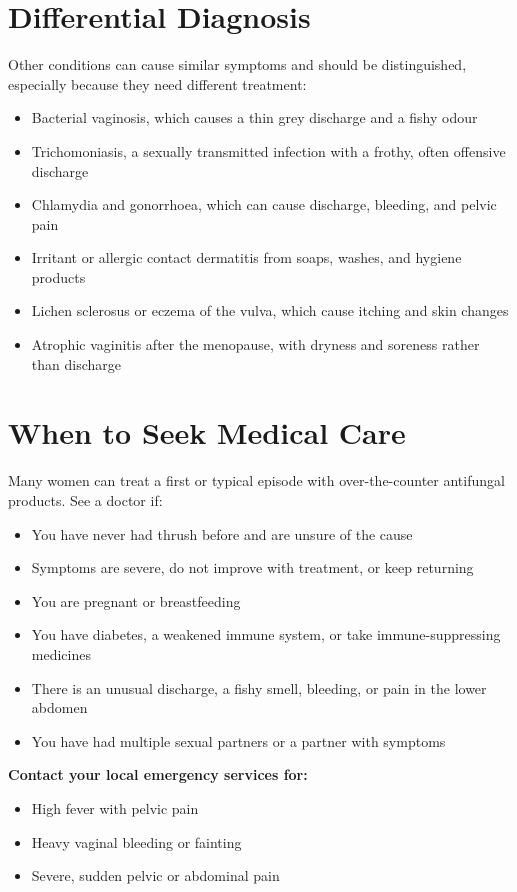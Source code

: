 \section*{Differential Diagnosis}
Other conditions can cause similar symptoms and should be distinguished, especially because they need different treatment:
\begin{itemize}
    \item Bacterial vaginosis, which causes a thin grey discharge and a fishy odour
    \item Trichomoniasis, a sexually transmitted infection with a frothy, often offensive discharge
    \item Chlamydia and gonorrhoea, which can cause discharge, bleeding, and pelvic pain
    \item Irritant or allergic contact dermatitis from soaps, washes, and hygiene products
    \item Lichen sclerosus or eczema of the vulva, which cause itching and skin changes
    \item Atrophic vaginitis after the menopause, with dryness and soreness rather than discharge
\end{itemize}

\section*{When to Seek Medical Care}
Many women can treat a first or typical episode with over-the-counter antifungal products. See a doctor if:
\begin{itemize}
    \item You have never had thrush before and are unsure of the cause
    \item Symptoms are severe, do not improve with treatment, or keep returning
    \item You are pregnant or breastfeeding
    \item You have diabetes, a weakened immune system, or take immune-suppressing medicines
    \item There is an unusual discharge, a fishy smell, bleeding, or pain in the lower abdomen
    \item You have had multiple sexual partners or a partner with symptoms
\end{itemize}
\textbf{Contact your local emergency services for:}
\begin{itemize}
    \item High fever with pelvic pain
    \item Heavy vaginal bleeding or fainting
    \item Severe, sudden pelvic or abdominal pain
\end{itemize}

